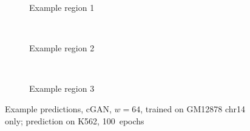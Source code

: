 \begin{figure}[p] %
    \scriptsize{}
    \begin{subfigure}{\textwidth}
        \centering
        \caption{Example  region 1} \label{fig:results:GAN64-14single_r1}
    \end{subfigure}\\[3mm]
    \begin{subfigure}{\textwidth}
        \centering
        \caption{Example region 2} \label{fig:results:GAN64-14single_r2}
    \end{subfigure}\\[3mm]
    \begin{subfigure}{\textwidth}
        \centering
        \caption{Example region 3} \label{fig:results:GAN64-14single_r3}
    \end{subfigure}
    \caption{Example predictions, cGAN, $w=64$, trained on GM12878 chr14 only; prediction on K562, 100~epochs} 
     \label{fig:results:GAN64-14single_matrices}
\end{figure}

